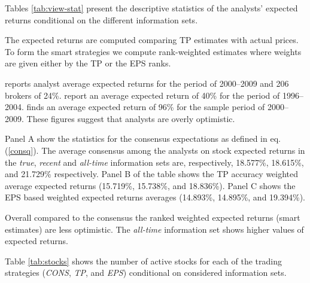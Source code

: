 \documentclass{article}\usepackage[]{graphicx}\usepackage[]{color}
\newcommand{\tr}{\textit{true}}
\newcommand{\naive}{\textit{recent}}
\newcommand{\default}{\textit{all-time}}
\begin{document}
Tables \ref{tab:view-stat} present the descriptive statistics of the analysts' expected returns conditional on the different information sets. 


The expected returns  are computed comparing TP estimates with actual prices. To form the smart strategies we compute rank-weighted estimates where weights are given either by the TP or the EPS ranks. 

\cite{bradshaw2002} reports analyst average expected returns for the period of 2000--2009 and 206 brokers of 24\%. \cite{da2011} report an average expected return of 40\% for the period of 1996--2004. \cite{zhou2013} finds an average expected return of 96\% for the sample period of 2000--2009. These figures suggest that analysts are overly optimistic.

Panel A show the statistics for the consensus expectations as defined in eq. (\ref{consq}). The average consensus among the analysts on stock expected returns in the  \tr{}, \naive{} and \default{} information sets are, respectively, 18.577\%, 18.615\%, and 21.729\% respectively. Panel B of the table shows the TP accuracy weighted average expected returns (15.719\%, 15.738\%, and 18.836\%). Panel C shows the EPS based weighted expected returns averages (14.893\%, 14.895\%, and 19.394\%). 

Overall compared to the consensus the ranked weighted expected returns (smart estimates) are less optimistic. The \default{} information set shows higher values of expected returns.

Table \ref{tab:stocks} shows the number of active stocks for each of the trading strategies (\textit{CONS}, \textit{TP}, and \textit{EPS}) conditional on considered information sets.
\end{document}
